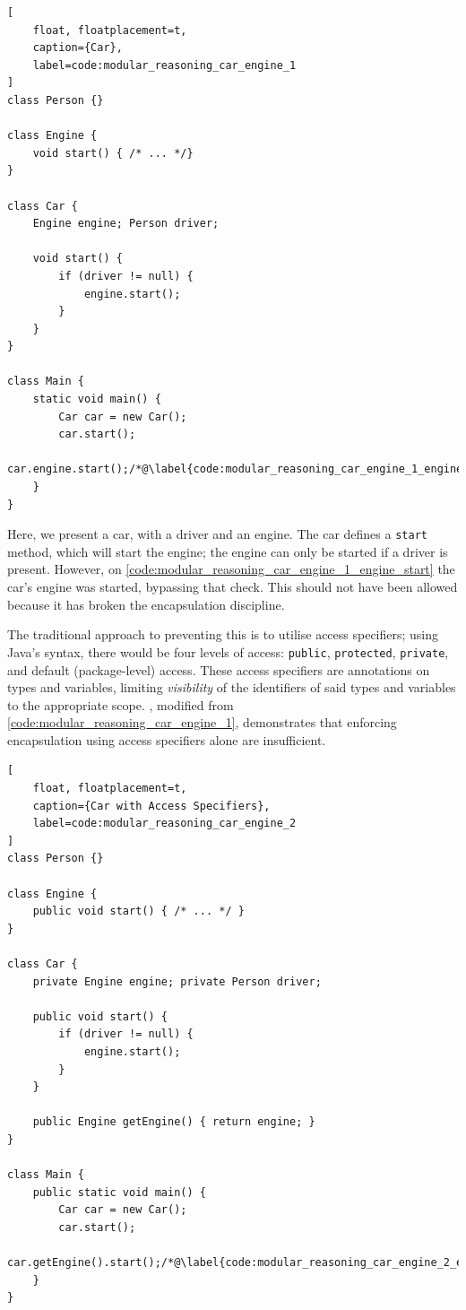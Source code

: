 \documentclass{acm_proc_article-sp}
\begin{document}
\begin{lstlisting}[
	float, floatplacement=t,
	caption={Car},
	label=code:modular_reasoning_car_engine_1
]
class Person {}

class Engine {
	void start() { /* ... */}
}

class Car {
	Engine engine; Person driver;

	void start() {
		if (driver != null) {
			engine.start();
		}
	}
}

class Main {
	static void main() {
		Car car = new Car();
		car.start();
		car.engine.start();/*@\label{code:modular_reasoning_car_engine_1_engine_start}@*/
	}
}
\end{lstlisting}

Here, we present a car, with a driver and an engine. The car defines a 
\lstinline|start| method, which will start the engine; the engine can 
only be started if a driver is present. However, on 
\cref{code:modular_reasoning_car_engine_1_engine_start} the car's engine 
was started, bypassing that check. This should not have been allowed because it 
has broken the encapsulation discipline.

The traditional approach to preventing this is to utilise access specifiers; 
using Java's syntax, there would be four levels of access: \lstinline|public|, 
\lstinline|protected|, \lstinline|private|, and default (package-level) access. 
These access specifiers are annotations on types and variables, limiting 
\emph{visibility} of the identifiers of said types and variables to the 
appropriate scope. , modified from 
\cref{code:modular_reasoning_car_engine_1}, demonstrates that enforcing 
encapsulation using access specifiers alone are insufficient.

\begin{lstlisting}[
	float, floatplacement=t,
	caption={Car with Access Specifiers},
	label=code:modular_reasoning_car_engine_2
]
class Person {}

class Engine {
	public void start() { /* ... */ }
}

class Car {
	private Engine engine; private Person driver;
	
	public void start() {
		if (driver != null) {
			engine.start();
		}
	}

	public Engine getEngine() { return engine; }
}

class Main {
	public static void main() {
		Car car = new Car();
		car.start();
		car.getEngine().start();/*@\label{code:modular_reasoning_car_engine_2_engine_start}@*/
	}
}

\end{lstlisting}
\end{document}
